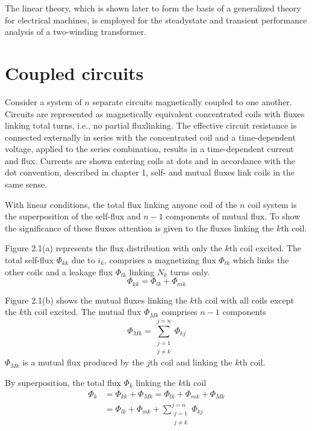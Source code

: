 \documentclass[a4paper,numbers=noenddot,12pt]{scrbook}
\begin{document}
The linear theory, which is shown later to form the basis of a generalized theory for electrical machines, is employed for the steady­state and transient performance analysis of a two-winding transformer.

\section{Coupled circuits}
Consider a system of $n$ separate circuits magnetically coupled to one another. Circuits are represented as magnetically equivalent concentrated coils with fluxes linking total turns, i.e., no partial flux­linking. The effective circuit resistance is connected externally in series with the concentrated coil and a time-dependent voltage, applied to the series combination, results in a time-dependent current and flux. Currents are shown entering coils at dots and in accordance with the dot convention, described in chapter 1, self- and mutual fluxes link coils in the same sense.

With linear conditions, the total flux linking anyone coil of the $n$ coil system is the superposition of the self-flux and $n - 1$ components of mutual flux. To show the significance of these fluxes attention is given to the fluxes linking the $k$th coil.

Figure 2.1(a) represents the flux distribution with only the $k$th coil excited. The total self-flux $\Phi_{kk}$ due to $i_k$, comprises a magnetizing flux $\Phi_{tk}$ which links the other coils and a leakage flux $\Phi_{lk}$ linking $N_k$ turns only.
\begin{equation}
    \Phi_{kk} = \Phi_{lk} + \Phi_{mk}
    \label{eq:Eq2.1}
\end{equation}

Figure 2.1(b) shows the mutual fluxes linking the $k$th coil with all coils except the $k$th coil excited. The mutual flux $\Phi_{Mk}$ comprises $n - 1$ components
\begin{equation}
    \Phi_{Mk} = \sum_{\substack{j = 1\\j \neq k}}^{j = n} \Phi_{kj}
    \label{eq:Eq2.2}
\end{equation}
$\Phi_{Mk}$ is a mutual flux produced by the $j$th coil and linking the $k$th coil.

By superposition, the total flux $\Phi_k$ linking the $k$th coil
\begin{align}
    \Phi_{k} & = \Phi_{kk} + \Phi_{Mk} = \Phi_{lk} + \Phi_{mk} + \Phi_{Mk} \nonumber \\
    & = \Phi_{lk} + \Phi_{mk} + \sum_{\substack{j = 1\\j \neq k}}^{j = n} \Phi_{kj}
    \label{eq:Eq2.3}
\end{align}
\end{document}
